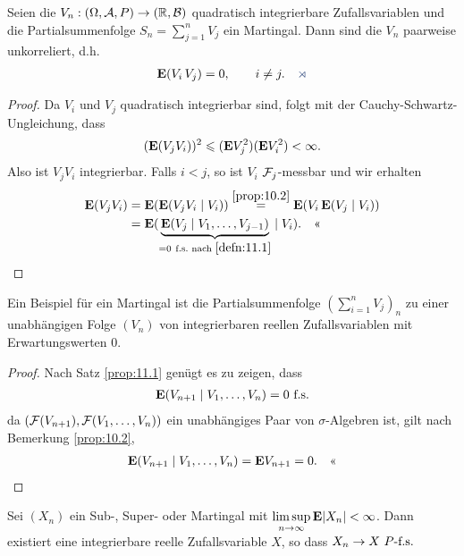 \begin{prop}
\label{prop:11.2}
Seien die $V_{n} : (\Omega , {\mathcal{A}}, P) \to (\mathbb{R}, {\mathcal{B}})$
quadratisch integrierbare Zufallsvariablen und
die Partialsummenfolge $S_n = \sum_{j=1}^n V_j$ ein Martingal.
Dann sind die $V_n$ paarweise unkorreliert, d.h. 
\begin{align*}
\E(V_i\, V_j) = 0,\qquad i\neq j.\fishhere
\end{align*}
\end{prop}
\begin{proof}
Da $V_i$ und $V_j$ quadratisch integrierbar sind, folgt mit
der Cauchy-Schwartz-Ungleichung, dass
\begin{align*}
(\textbf{E}(V_jV_i))^2 \leqslant (\textbf{E} V_j^2)(\textbf{E} V_i^2) < \infty.
\end{align*}
Also ist $V_jV_i$ integrierbar. Falls $i< j$, so ist $V_i$ $\mathcal{F}_j$-messbar und
wir erhalten
\begin{align*}
\textbf{E}(V_jV_i) &= \textbf{E}(\textbf{E}(V_jV_i\mid V_i)) \overset{\ref{prop:10.2}}{=}
\textbf{E}(V_i\,\textbf{E}(V_j\mid V_i)) \\ &
= \textbf{E}(\underbrace{\textbf{E}(V_j\mid
V_1,\ldots,V_{j-1})}_{=0\ \text{f.s.}\text{ nach }\ref{defn:11.1}}\mid V_i).\quad\text{<<}
\end{align*}
\end{proof}

\begin{bsp}
Ein Beispiel für
ein Martingal ist die Partialsummenfolge $(\sum^ {n}_{i=1} V_{j})_{n}$ zu einer unabhängigen Folge $(V_{n})$ von
integrierbaren reellen Zufallsvariablen mit Erwartungswerten $0$.\bsphere
\begin{proof}

Nach Satz \ref{prop:11.1} genügt es zu zeigen, dass 
\begin{align*}
\textbf{E}(V_{n+1}\mid V_1,\ldots,V_n) = 0 \ \text{f.s.}
\end{align*}
da $(\mathcal{F}(V_{n+1}), \mathcal{F}(V_1,\ldots,V_n))$ ein unabhängiges Paar von
$\sigma$-Algebren ist, gilt nach Bemerkung \ref{prop:10.2},
\begin{align*}
\textbf{E}(V_{n+1}\mid V_1,\ldots,V_n) = \textbf{E} V_{n+1} = 0.\quad\text{<<}
\end{align*}
\end{proof}
\end{bsp}

\begin{prop}
\label{prop:11.3}
Sei $(X_{n})$ ein Sub-, Super- oder Martingal mit $\limsup\limits_{n\to\infty}
\textbf{E}|X_{n}| < \infty$.
Dann existiert eine integrierbare reelle Zufallsvariable $X$, so dass $X_{n}\to
X\ P\text{-f.s.}$\fishhere
\end{prop}

